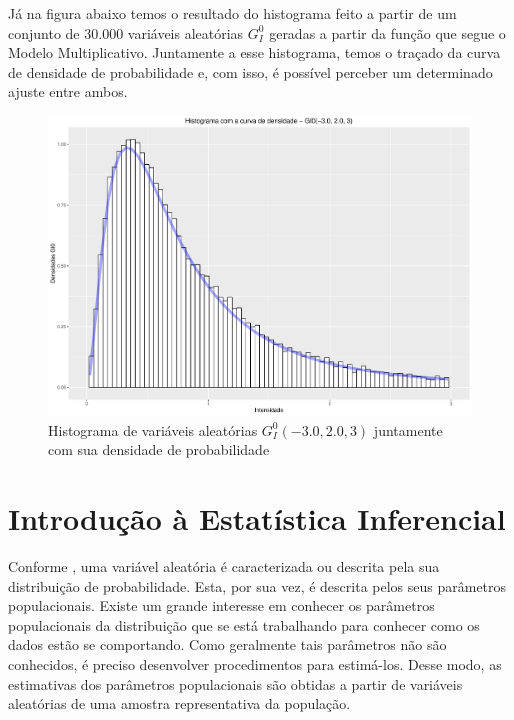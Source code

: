 Já na figura abaixo temos o resultado do histograma feito a partir de um conjunto de $30.000$ variáveis aleatórias $G_I^0$ geradas a partir da função que segue o Modelo Multiplicativo. Juntamente a esse histograma, temos o traçado da curva de densidade de probabilidade e, com isso, é possível perceber um determinado ajuste entre ambos.

\begin{figure}[H]
     \centering
     \includegraphics[scale=0.5]{plots/GI0RandVar.pdf}
     \caption{Histograma de variáveis aleatórias $G_I^0(-3.0, 2.0, 3)$ juntamente com sua densidade de probabilidade}
     \label{graf_genGI0}
\end{figure}


\section{Introdução à Estatística Inferencial}

Conforme \citet{CasellaBergerStatisticalInference}, uma variável aleatória é caracterizada ou descrita pela sua distribuição de probabilidade. Esta, por sua vez, é descrita pelos seus parâmetros populacionais. Existe um grande interesse em conhecer os parâmetros populacionais da distribuição que se está trabalhando para conhecer como os dados estão se comportando. Como geralmente tais parâmetros não são conhecidos, é preciso desenvolver procedimentos para estimá-los. Desse modo, as estimativas dos parâmetros populacionais são obtidas a partir de variáveis aleatórias de uma amostra representativa da população.
 
